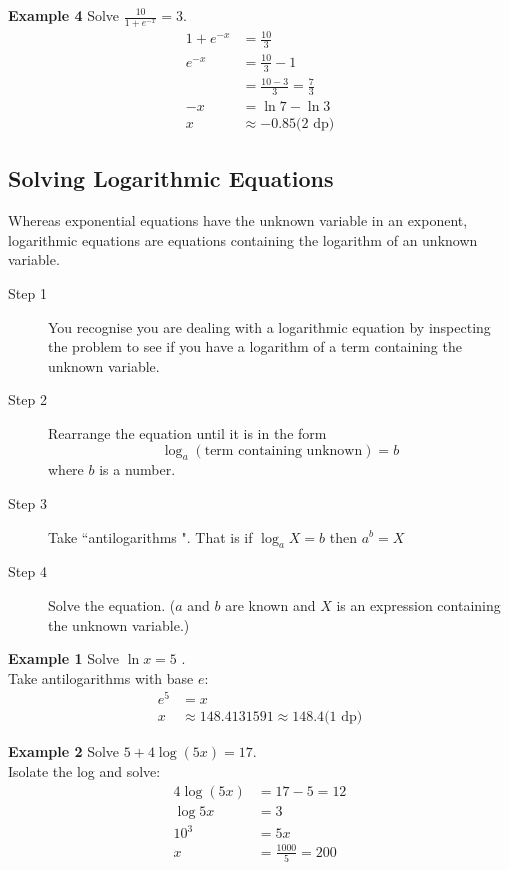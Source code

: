\textbf{Example 4} Solve $\frac{10}{1 +e^{ -x}} =3$.\medskip\\
\solution
\begin{align*}1 +e^{ -x} &  = \frac{10}{3} \\
e^{ -x} &  = \frac{10}{3} -1 \\
&  = \frac{10 -3}{3} =\frac{7}{3} \\
-x &  = \ln  7 -\ln  3 \\
x &  \approx  -0.85\text{(2 dp)}\end{align*}


\subsection*{Solving Logarithmic Equations}
Whereas exponential equations have the unknown variable in an exponent, logarithmic equations are equations containing the logarithm of an unknown variable. 

\begin{description}
	\item [Step 1] You recognise you are dealing with a logarithmic equation
	by inspecting the problem to see if you have a logarithm of a term containing the unknown variable. 
	
	\item [Step	2] Rearrange the equation until it is in the form
	\begin{equation*}\log _{a} \left (\text{term containing unknown}\right ) =b
	\end{equation*} where $b$ is a number. 
	
	\item [Step 3] Take	``antilogarithms ". That is if $\log _{a} X =b$ then $a^{b} =X$ 
	
	\item [Step 4] Solve the equation.
	($a$ and $b$ are known and $X$ is an expression containing the unknown variable.) \end{description}

\textbf{Example 1} Solve $\ln  x =5$ .\medskip\\
\solution Take antilogarithms with base $e$:
\begin{align*}e^{5} &  = x \\
x &  \approx 148.4131591 \approx 148.4\text{(1 dp)}\end{align*}

\textbf{Example 2} Solve $5 +4 \log  \left (5 x\right ) =17$.\medskip\\
\solution Isolate the log and solve:
\begin{align*}4 \log  \left (5 x\right ) &  = 17 -5 =12 \\
\log  5 x &  = 3 \\
\text{}10^{3} &  = 5 x \\
x &  = \frac{1000}{5} =200\end{align*}


